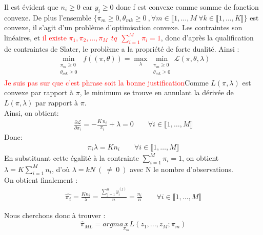 \documentclass{article}
\begin{document}
Il est évident que $n_i \geq 0$ car $y_i \geq 0$ donc f est convexe comme somme de fonction convexe. De plus l'ensemble $\{\pi_m\geq0 ,\theta_{mk}\geq0 \ , \forall m \in \llbracket 1,\ldots,M \ \forall k \in \llbracket 1,\ldots,K \rrbracket\}$ est convexe, il s'agit d'un problème d'optimisation convexe. Les contraintes son linéaires, et \textcolor{red}{il existe $\pi_1,\pi_2,...,\pi_M  \ \ tq \ \ \sum_{i=1}^{M}{\pi_i}=1$}, donc d'après la qualification de contraintes de Slater, le problème a la propriété de forte dualité. Ainsi :
\begin{align*}
\min_{\substack{\pi_m\geq0\\\theta_{mk}\geq0}}\;f((\pi,\theta))=\max_\lambda \min_{\substack{\pi_m\geq0\\\theta_{mk}\geq0}} \mathcal{L}(\pi,\theta,\lambda)
\end{align*}
\textcolor{red}{Je suis pas sur que c'est phrase soit la bonne justification}Comme $L(\pi,\lambda)$ est convexe par rapport à $\pi$, le minimum se trouve en annulant la dérivée de $L(\pi,\lambda)$ par rapport à $\pi$.
\\Ainsi, on obtient:
\begin{align*}
\frac{\partial \mathcal{L}}{\partial \pi_i} = -\frac{K\,n_i}{\pi_i}+\lambda=0 \qquad \forall i\in \llbracket 1,\ldots,M \rrbracket 
\end{align*}
Donc:
\begin{align*} 
\pi_i\lambda=Kn_i \qquad \forall i\in \llbracket 1,\ldots,M \rrbracket 
\end{align*}
En substituant cette égalité à la contrainte $\sum_{i=1}^{M}{\pi_i}=1$, on obtient $\lambda= K\sum_{i=1}^{M}{n_i}$, d'où $\lambda=kN~(~\neq~0~)$ avec N le nombre d'observations.
\\On obtient finalement : 
\begin{align*} 
\widehat{\pi_i}=\frac{Kn_i}{\lambda} 
=\frac{\sum_{j=1}^{n}{y_i^{(j)}}}{n}
=\frac{n_i}{n}
\qquad \forall i\in \llbracket 1,\ldots,M \rrbracket 
\end{align*}





\vspace{5cm}

Nous cherchons donc à trouver :
\[
\widehat{\pi}_{ML}=argmax\limits_{\pi_m}{L(z_1,...,z_M;\pi_m)}
\]
\end{document}
